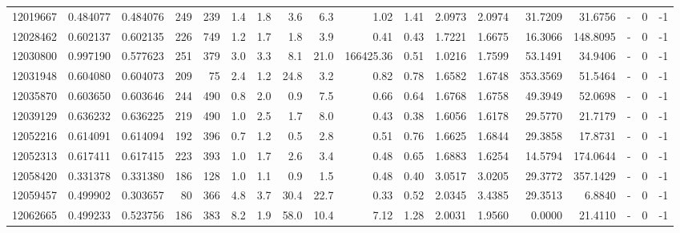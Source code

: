 \begin{tabular}{rrrrrrrrrrrrrrrlrr}
  12019667 & 0.484077 &   0.484076 &  249 &  239 &      1.4 &      1.8 &     3.6 &      6.3 &       1.02 &        1.41 &  2.0973 &  2.0974 &   31.7209 &   31.6756 &             - &        0 &         -1 \\
  12028462 & 0.602137 &   0.602135 &  226 &  749 &      1.2 &      1.7 &     1.8 &      3.9 &       0.41 &        0.43 &  1.7221 &  1.6675 &   16.3066 &  148.8095 &             - &        0 &         -1 \\
  12030800 & 0.997190 &   0.577623 &  251 &  379 &      3.0 &      3.3 &     8.1 &     21.0 &  166425.36 &        0.51 &  1.0216 &  1.7599 &   53.1491 &   34.9406 &             - &        0 &         -1 \\
  12031948 & 0.604080 &   0.604073 &  209 &   75 &      2.4 &      1.2 &    24.8 &      3.2 &       0.82 &        0.78 &  1.6582 &  1.6748 &  353.3569 &   51.5464 &             - &        0 &         -1 \\
  12035870 & 0.603650 &   0.603646 &  244 &  490 &      0.8 &      2.0 &     0.9 &      7.5 &       0.66 &        0.64 &  1.6768 &  1.6758 &   49.3949 &   52.0698 &             - &        0 &         -1 \\
  12039129 & 0.636232 &   0.636225 &  219 &  490 &      1.0 &      2.5 &     1.7 &      8.0 &       0.43 &        0.38 &  1.6056 &  1.6178 &   29.5770 &   21.7179 &             - &        0 &         -1 \\
  12052216 & 0.614091 &   0.614094 &  192 &  396 &      0.7 &      1.2 &     0.5 &      2.8 &       0.51 &        0.76 &  1.6625 &  1.6844 &   29.3858 &   17.8731 &             - &        0 &         -1 \\
  12052313 & 0.617411 &   0.617415 &  223 &  393 &      1.0 &      1.7 &     2.6 &      3.4 &       0.48 &        0.65 &  1.6883 &  1.6254 &   14.5794 &  174.0644 &             - &        0 &         -1 \\
  12058420 & 0.331378 &   0.331380 &  186 &  128 &      1.0 &      1.1 &     0.9 &      1.5 &       0.48 &        0.40 &  3.0517 &  3.0205 &   29.3772 &  357.1429 &             - &        0 &         -1 \\
  12059457 & 0.499902 &   0.303657 &   80 &  366 &      4.8 &      3.7 &    30.4 &     22.7 &       0.33 &        0.52 &  2.0345 &  3.4385 &   29.3513 &    6.8840 &             - &        0 &         -1 \\
  12062665 & 0.499233 &   0.523756 &  186 &  383 &      8.2 &      1.9 &    58.0 &     10.4 &       7.12 &        1.28 &  2.0031 &  1.9560 &    0.0000 &   21.4110 &             - &        0 &         -1 \\

\end{tabular}
